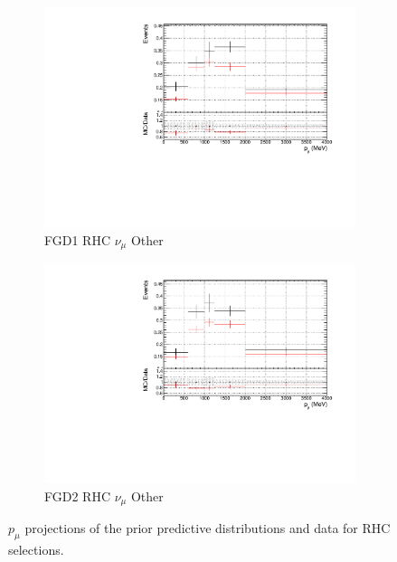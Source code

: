 \begin{figure}[!h]
\begin{subfigure}{0.49\textwidth}
  \centering
  \includegraphics[width=\textwidth]{figs/prioronly1D_p_FGD1_NuMuBkg_CCOther_in_AntiNu_Mode}
  \caption{FGD1 RHC $\nu_{\mu}$ Other}
\end{subfigure}
\begin{subfigure}{0.49\textwidth}
  \centering
  \includegraphics[width=\textwidth]{figs/prioronly1D_p_FGD2_NuMuBkg_CCOther_in_AntiNu_Mode}
  \caption{FGD2 RHC $\nu_{\mu}$ Other}
\end{subfigure}
\caption{$p_{\mu}$ projections of the prior predictive distributions and data for RHC \numu selections.}
\label{fig:priorpost_rhc_numu_p}
\end{figure}

